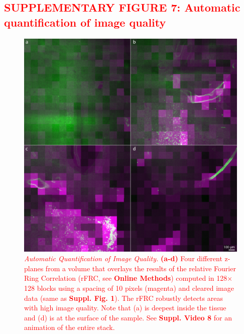 \documentclass[]{spie}  %
\def\red{\textcolor{red}}
\begin{document}
\subsection*{\red{SUPPLEMENTARY FIGURE 7: Automatic quantification of image quality}}
\vspace{1mm}
\begin{figure}[h!]
\includegraphics[width=\textwidth]{rFRC.jpg}
\vspace{-2.0mm}
\caption{\hspace{-0.5mm} \red{\emph{Automatic Quantification of Image Quality.} \textbf{(a-d)} Four different z-planes from a volume that overlays the results of the relative Fourier Ring Correlation (rFRC, see \textbf{Online Methods}) computed in 128$\times$128 blocks using a spacing of 10 pixels (magenta) and cleared image data (same as \textbf{Suppl. Fig. 1}). The rFRC robustly detects areas with high image quality. Note that (a) is deepest inside the tissue and (d) is at the surface of the sample. See \textbf{Suppl. Video 8} for an animation of the entire stack.
}}
\label{fig:sup-rFRC}
\end{figure}

\pagebreak
\end{document}
